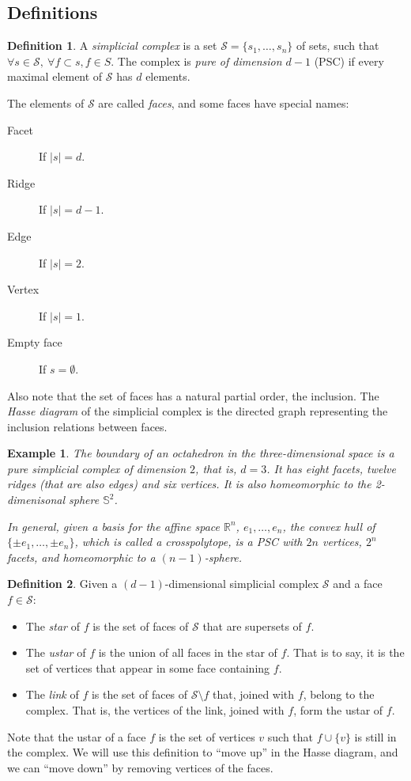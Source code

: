 \documentclass[12pt,a4paper]{article}
\theoremstyle{plain}
\newtheorem*{example}{Example}
\theoremstyle{definition}
\newtheorem{definition}{Definition}
\begin{document}
\subsection{Definitions}
\begin{definition}
  A \emph{simplicial complex}  is a set $\mathcal{S}=\{s_1,\dots,s_n\}$ of sets, such that $\forall s\in \mathcal{S}, \  \forall f\subset s, f\in{S}$. The complex is \emph{pure of dimension $d-1$} (PSC) if every maximal element of $\mathcal{S}$ has $d$ elements.

  The elements of $\mathcal{S}$ are called \emph{faces}, and some faces have special names:
  \begin{description}
    \item[Facet] If $|s|=d$.
    \item[Ridge] If $|s|=d-1$.
    \item[Edge] If $|s|=2$.
    \item[Vertex] If $|s|=1$.
    \item[Empty face] If $s=\emptyset$.
  \end{description}
  Also note that the set of faces has a natural partial order, the inclusion. The \emph{Hasse diagram} of the simplicial complex is the directed graph representing the inclusion relations between faces.
\end{definition}

\begin{example}
  The boundary of an octahedron in the three-dimensional space is a pure simplicial complex of dimension $2$, that is, $d=3$. It has eight facets, twelve ridges (that are also edges) and six vertices. It is also homeomorphic to the 2-dimenisonal sphere $\mathbb{S}^2$.

  In general, given a basis for the affine space $\mathbb{R}^n$, $e_1,\dots,e_n$, the convex hull of $\{\pm e_1,\dots,\pm e_n\}$, which is called a \emph{crosspolytope}, is a PSC with $2n$ vertices, $2^n$ facets, and homeomorphic to a $(n-1)$-sphere.
\end{example}

\begin{definition}
  Given a $(d-1)$-dimensional simplicial complex $\mathcal{S}$ and a face $f\in\mathcal{S}$:
  \begin{itemize}
    \item The \emph{star} of $f$ is the set of faces of $\mathcal{S}$ that are supersets of $f$.
    \item The \emph{ustar} of $f$ is the union of all faces in the star of $f$. That is to say, it is the set of vertices that appear in some face containing $f$.
    \item The \emph{link} of $f$ is the set of faces of $\mathcal{S}\setminus f$  that, joined with $f$, belong to the complex. That is, the vertices of the link, joined with $f$, form the ustar of $f$.
  \end{itemize}
  Note that the ustar of a face $f$ is the set of vertices $v$ such that $f\cup \{v\}$ is still in the complex. We will use this definition to ``move up'' in the Hasse diagram, and we can ``move down'' by removing vertices of the faces.
\end{definition}
\end{document}
